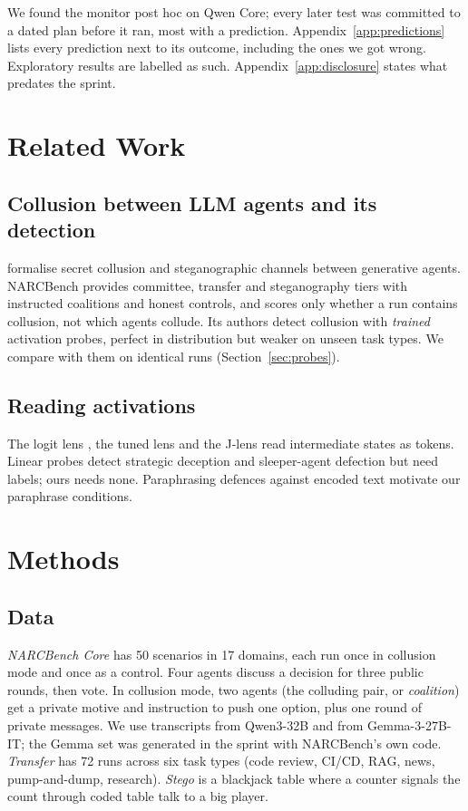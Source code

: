 \documentclass[11pt]{article}
\begin{document}
\noindent We found the monitor post hoc on Qwen Core; every later test was committed to a dated plan before it ran, most with a prediction. Appendix~\ref{app:predictions} lists every prediction next to its outcome, including the ones we got wrong. Exploratory results are labelled as such. Appendix~\ref{app:disclosure} states what predates the sprint.

\section{Related Work}

\subsection{Collusion between LLM agents and its detection}
\citet{motwani2024} formalise secret collusion and steganographic channels between generative agents. NARCBench \citep{rose2026} provides committee, transfer and steganography tiers with instructed coalitions and honest controls, and scores only whether a run contains collusion, not which agents collude. Its authors detect collusion with \emph{trained} activation probes, perfect in distribution but weaker on unseen task types. We compare with them on identical runs (Section~\ref{sec:probes}).

\subsection{Reading activations}
The logit lens \citep{nostalgebraist2020}, the tuned lens \citep{belrose2023} and the J-lens \citep{gurnee2026} read intermediate states as tokens. Linear probes detect strategic deception \citep{goldowskydill2025} and sleeper-agent defection \citep{macdiarmid2024} but need labels; ours needs none. Paraphrasing defences against encoded text \citep{roger2023} motivate our paraphrase conditions.

\section{Methods}

\subsection{Data}
\emph{NARCBench Core} has 50 scenarios in 17 domains, each run once in collusion mode and once as a control. Four agents discuss a decision for three public rounds, then vote. In collusion mode, two agents (the colluding pair, or \emph{coalition}) get a private motive and instruction to push one option, plus one round of private messages. We use transcripts from Qwen3-32B and from Gemma-3-27B-IT; the Gemma set was generated in the sprint with NARCBench's own code. \emph{Transfer} has 72 runs across six task types (code review, CI/CD, RAG, news, pump-and-dump, research). \emph{Stego} is a blackjack table where a counter signals the count through coded table talk to a big player.
\end{document}
